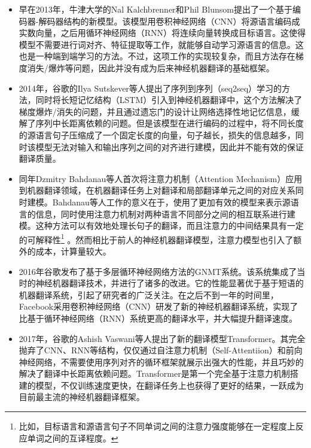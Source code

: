 \begin{itemize}
\vspace{0.5em}
\item 早在2013年，牛津大学的Nal Kalchbrenner和Phil Blunsom提出了一个基于编码器-解码器结构的新模型\cite{kalchbrenner-blunsom-2013-recurrent}。该模型用卷积神经网络（CNN）将源语言编码成实数向量，之后用循环神经网络（RNN）将连续向量转换成目标语言。这使得模型不需要进行词对齐、特征提取等工作，就能够自动学习源语言的信息。这也是一种端到端学习的方法。不过，这项工作的实现较复杂，而且方法存在梯度消失/爆炸等问题\cite{HochreiterThe,BENGIO1994Learning}，因此并没有成为后来神经机器翻译的基础框架。
\vspace{0.5em}
\item 2014年，谷歌的Ilya Sutskever等人提出了序列到序列（seq2seq）学习的方法，同时将长短记忆结构（LSTM）引入到神经机器翻译中，这个方法解决了梯度爆炸/消失的问题，并且通过遗忘门的设计让网络选择性地记忆信息，缓解了序列中长距离依赖的问题\cite{NIPS2014_5346}。但是该模型在进行编码的过程中，将不同长度的源语言句子压缩成了一个固定长度的向量，句子越长，损失的信息越多，同时该模型无法对输入和输出序列之间的对齐进行建模，因此并不能有效的保证翻译质量。
\vspace{0.5em}
\item 同年Dzmitry Bahdanau等人首次将注意力机制（Attention Mechanism）应用到机器翻译领域，在机器翻译任务上对翻译和局部翻译单元之间的对应关系同时建模\cite{bahdanau2014neural}。Bahdanau等人工作的意义在于，使用了更加有效的模型来表示源语言的信息，同时使用注意力机制对两种语言不同部分之间的相互联系进行建模。这种方法可以有效地处理长句子的翻译，而且注意力的中间结果具有一定的可解释性\footnote{比如，目标语言和源语言句子不同单词之间的注意力强度能够在一定程度上反应单词之间的互译程度。} 。然而相比于前人的神经机器翻译模型，注意力模型也引入了额外的成本，计算量较大。
\vspace{0.5em}
\item 2016年谷歌发布了基于多层循环神经网络方法的GNMT系统。该系统集成了当时的神经机器翻译技术，并进行了诸多的改进。它的性能显著优于基于短语的机器翻译系统\cite{Wu2016GooglesNM}，引起了研究者的广泛关注。在之后不到一年的时间里，Facebook采用卷积神经网络（CNN）研发了新的神经机器翻译系统\cite{DBLP:journals/corr/GehringAGYD17}，实现了比基于循环神经网络（RNN）系统更高的翻译水平，并大幅提升翻译速度。
\vspace{0.5em}
\item 2017年，谷歌的Ashish Vaswani等人提出了新的翻译模型Transformer。其完全抛弃了CNN、RNN等结构，仅仅通过自注意力机制（Self-Attentiion）和前向神经网络，不需要使用序列对齐的循环框架就展示出强大的性能，并且巧妙的解决了翻译中长距离依赖问题\cite{NIPS2017_7181}。Transformer是第一个完全基于注意力机制搭建的模型，不仅训练速度更快，在翻译任务上也获得了更好的结果，一跃成为目前最主流的神经机器翻译框架。
\vspace{0.5em}
\end{itemize}

